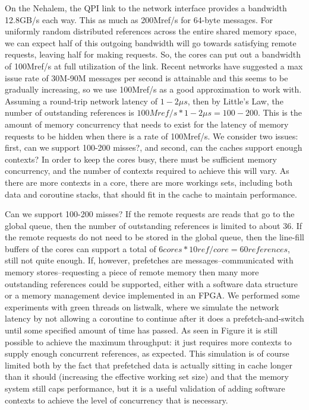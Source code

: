 	On the Nehalem, the QPI link to the network interface provides a bandwidth 12.8GB/s each way. This as much as 200Mref/s for 64-byte messages. For uniformly random distributed references across the entire shared memory space, we can expect half of this outgoing bandwidth will go towards satisfying remote requests, leaving half for making requests.  So, the cores can put out a bandwidth of 100Mref/s at full utilization of the link. Recent networks have suggested a max issue rate of 30M-90M messages per second is attainable  and this seems to be gradually increasing, so we use 100Mref/s as a good approximation to work with. Assuming a round-trip network latency of $1-2\mu s$, then by Little's Law, the number of outstanding references is $100Mref/s*1-2\mu s = 100-200$.  This is the amount of memory concurrency that needs to exist for the latency of memory requests to be hidden when there is a rate of 100Mref/s.
We consider two issues: first, can we support 100-200 misses?, and second, can the caches support enough contexts? 
In order to keep the cores busy, there must be sufficient memory concurrency, and the number of contexts required to achieve this will vary. As there are more contexts in a core, there are more workings sets, including both data and coroutine stacks, that should fit in the cache to maintain performance.
	
	Can we support 100-200 misses? If the remote requests are reads that go to the global queue, then the number of outstanding references is limited to about 36. If the remote requests do not need to be stored in the global queue, then the line-fill buffers of the cores can support a total of $6 cores * 10 ref/core = 60 references$, still not quite enough. If, however, prefetches are messages--communicated with memory stores--requesting a piece of remote memory then many more outstanding references could be supported, either with a software data structure or a memory management device implemented in an FPGA.
	We performed some experiments with green threads on listwalk, where we simulate the network latency by not allowing a coroutine to continue after it does a prefetch-and-switch until some specified amount of time has passed.  As seen in Figure  it is still possible to achieve the maximum throughput: it just requires more contexts to supply enough concurrent references, as expected. This simulation is of course limited both by the fact that prefetched data is actually sitting in cache longer than it should (increasing the effective working set size) and that the memory system still caps performance, but it is a useful validation of adding software contexts to achieve the level of concurrency that is necessary.
	
